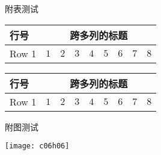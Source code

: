 {\begin{appfig}[!htb]
		\label{appfig:deltaall}
	\end{appfig}

附表测试

\begin{apptab}[!htbp]
    \label{apptab:1}
    \centering
    \footnotesize%
    \setlength{\tabcolsep}{4pt}%
    \renewcommand{\arraystretch}{1.2}%
    \begin{tabular}{lcccccccc}
        \hline
        行号 & \multicolumn{8}{c}{跨多列的标题}\\
        \hline
        Row 1 & $1$ & $2$ & $3$ & $4$ & $5$ & $6$ & $7$ & $8$\\
        \hline
    \end{tabular}
\end{apptab}


\begin{apptab}[!htbp]
    \label{apptab:2}
    \centering
    \footnotesize%
    \setlength{\tabcolsep}{4pt}%
    \renewcommand{\arraystretch}{1.2}%
    \begin{tabular}{lcccccccc}
        \hline
        行号 & \multicolumn{8}{c}{跨多列的标题}\\
        \hline
        Row 1 & $1$ & $2$ & $3$ & $4$ & $5$ & $6$ & $7$ & $8$\\
        \hline
    \end{tabular}
\end{apptab}

附图测试

\begin{appfig}[!htbp]
    \centering
    \texttt{[image: c06h06]}
    
    \label{appfig:1}
\end{appfig}

    
}
